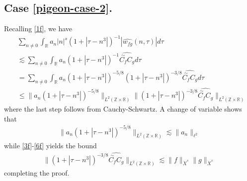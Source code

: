 \documentclass[12pt,reqno]{amsart}
\numberwithin{equation}{section}  %
\numberwithin{figure}{section}
\newcommand{\rr}{\mathbb{R}}
\newcommand{\zz}{\mathbb{Z}}
\newcommand{\ci}{\mathbb{T}}
\newcommand{\wh}{\widehat}
\theoremstyle{plain}
\theoremstyle{definition}
\theoremstyle{remark}
\begin{document}
\subsection{Case \eqref{pigeon-case-2}.} Recalling \eqref{1f}, we have
%
\begin{equation}
	\begin{split}
		& \sum_{n \neq 0} \int_{\rr} a_n |n|^s \left( 1 + | \tau - n^3 | \right)^{-1} | 
		\wh{w_{fg}}(n, \tau) | d \tau
		\\
		& \lesssim \sum_{n \neq 0}  \int_{\rr} a_{n} (1+ | \tau - n^{3} |)^{-1} \wh{\overset{\sim}{C_f} C_g} d
		\tau
	\\	
	& = \sum_{n \neq 0} \int_{\rr} a_{n} (1+ | \tau - n^{3} |)^{-5/8} (1 + | \tau - n^{3}
	|)^{-3/8} \wh{\overset{\sim}{C_f} C_g} d
		\tau
		\\
		& \le \|a_{n} (1 + | \tau - n^{3} |)^{-5/8}\|_{L^2(\zz \times \rr)}  \| (1 +
		| \tau - n^{3} |)^{-3/8} \wh{\overset{\sim}{C_f} C_g}  \|_{L^2(\zz \times
		\rr)}
	\end{split}
\end{equation}
%
%
where the last step follows from Cauchy-Schwartz. A change of variable shows
that
%
%
\begin{equation*}
	\begin{split}
		\|a_{n} (1 + | \tau - n^{3} |)^{-5/8}\|_{L^2(\zz \times \rr)} \lesssim
		\|a_{n}\|_{\ell^2}
	\end{split}
\end{equation*}
%
%
while \eqref{3f}-\eqref{6f} yields the bound
%
%
\begin{equation*}
	\begin{split}
	\| (1 + | \tau - n^{3} |)^{-3/8} \wh{\overset{\sim}{C_f} C_g}  \|_{L^2(\zz
	\times \rr)} \lesssim \|f\|_{\dot{X}^s} \|g\|_{\dot{X}^s}
	\end{split}
\end{equation*}
%
%
completing the proof. \qquad \qedsymbol
%
%
\newpage
%
%
%
%
\appendix
\end{document}
